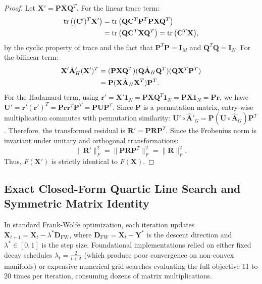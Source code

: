 \documentclass[conference]{IEEEtran}
\begin{document}
\begin{proof}
Let $\mathbf{X}' = \mathbf{P}\mathbf{X}\mathbf{Q}^T$. For the linear trace term:
\begin{align}
\operatorname{tr}\big((\mathbf{C}')^T\mathbf{X}'\big) &= \operatorname{tr}\big(\mathbf{Q}\mathbf{C}^T\mathbf{P}^T\mathbf{P}\mathbf{X}\mathbf{Q}^T\big) \notag\\
&= \operatorname{tr}\big(\mathbf{Q}\mathbf{C}^T\mathbf{X}\mathbf{Q}^T\big) = \operatorname{tr}\big(\mathbf{C}^T\mathbf{X}\big),
\end{align}
by the cyclic property of trace and the fact that $\mathbf{P}^T\mathbf{P} = \mathbf{I}_M$ and $\mathbf{Q}^T\mathbf{Q} = \mathbf{I}_N$. For the bilinear term:
\begin{align}
\mathbf{X}'\hat{\mathbf{A}}'_H(\mathbf{X}')^T &= (\mathbf{P}\mathbf{X}\mathbf{Q}^T)(\mathbf{Q}\hat{\mathbf{A}}_H\mathbf{Q}^T)(\mathbf{Q}\mathbf{X}^T\mathbf{P}^T) \notag\\
&= \mathbf{P}(\mathbf{X}\hat{\mathbf{A}}_H\mathbf{X}^T)\mathbf{P}^T.
\end{align}
For the Hadamard term, using $\mathbf{r}' = \mathbf{X}'\mathbf{1}_N = \mathbf{P}\mathbf{X}\mathbf{Q}^T\mathbf{1}_N = \mathbf{P}\mathbf{X}\mathbf{1}_N = \mathbf{P}\mathbf{r}$, we have $\mathbf{U}' = \mathbf{r}'(\mathbf{r}')^T = \mathbf{P}\mathbf{r}\mathbf{r}^T\mathbf{P}^T = \mathbf{P}\mathbf{U}\mathbf{P}^T$. Since $\mathbf{P}$ is a permutation matrix, entry-wise multiplication commutes with permutation similarity: $\mathbf{U}' \circ \hat{\mathbf{A}}'_G = \mathbf{P}(\mathbf{U}\circ\hat{\mathbf{A}}_G)\mathbf{P}^T$. Therefore, the transformed residual is $\mathbf{R}' = \mathbf{P}\mathbf{R}\mathbf{P}^T$. Since the Frobenius norm is invariant under unitary and orthogonal transformations:
\begin{equation}
\|\mathbf{R}'\|_F^2 = \|\mathbf{P}\mathbf{R}\mathbf{P}^T\|_F^2 = \|\mathbf{R}\|_F^2.
\end{equation}
Thus, $F(\mathbf{X}')$ is strictly identical to $F(\mathbf{X})$.
\end{proof}

\subsection{Exact Closed-Form Quartic Line Search and Symmetric Matrix Identity}

In standard Frank-Wolfe optimization, each iteration updates $\mathbf{X}_{t+1} = \mathbf{X}_t - \lambda^* \mathbf{D}_{\text{FW}}$, where $\mathbf{D}_{\text{FW}} = \mathbf{X}_t - \mathbf{Y}^*$ is the descent direction and $\lambda^* \in [0, 1]$ is the step size. Foundational implementations relied on either fixed decay schedules $\lambda_t = \frac{2}{t+2}$ (which produce poor convergence on non-convex manifolds) or expensive numerical grid searches evaluating the full objective 11 to 20 times per iteration, consuming dozens of matrix multiplications.
\end{document}
